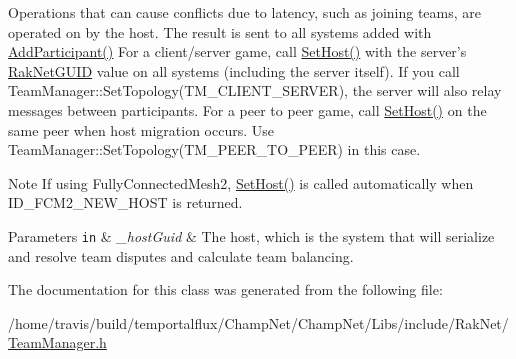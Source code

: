 Operations that can cause conflicts due to latency, such as joining teams, are operated on by the host. The result is sent to all systems added with \hyperlink{class_rak_net_1_1_t_m___world_a75531795fd1adc74d7edae660c4ecc17}{Add\-Participant()} For a client/server game, call \hyperlink{class_rak_net_1_1_t_m___world_a8de7c1244f4b38d2ad612c3c98d614ca}{Set\-Host()} with the server's \hyperlink{struct_rak_net_1_1_rak_net_g_u_i_d}{Rak\-Net\-G\-U\-I\-D} value on all systems (including the server itself). If you call Team\-Manager\-::\-Set\-Topology(\-T\-M\-\_\-\-C\-L\-I\-E\-N\-T\-\_\-\-S\-E\-R\-V\-E\-R), the server will also relay messages between participants. For a peer to peer game, call \hyperlink{class_rak_net_1_1_t_m___world_a8de7c1244f4b38d2ad612c3c98d614ca}{Set\-Host()} on the same peer when host migration occurs. Use Team\-Manager\-::\-Set\-Topology(\-T\-M\-\_\-\-P\-E\-E\-R\-\_\-\-T\-O\-\_\-\-P\-E\-E\-R) in this case. \begin{DoxyNote}{Note}
If using Fully\-Connected\-Mesh2, \hyperlink{class_rak_net_1_1_t_m___world_a8de7c1244f4b38d2ad612c3c98d614ca}{Set\-Host()} is called automatically when I\-D\-\_\-\-F\-C\-M2\-\_\-\-N\-E\-W\-\_\-\-H\-O\-S\-T is returned. 
\end{DoxyNote}

\begin{DoxyParams}[1]{Parameters}
\mbox{\tt in}  & {\em \-\_\-host\-Guid} & The host, which is the system that will serialize and resolve team disputes and calculate team balancing. \\
\hline
\end{DoxyParams}


The documentation for this class was generated from the following file\-:\begin{DoxyCompactItemize}
\item 
/home/travis/build/temportalflux/\-Champ\-Net/\-Champ\-Net/\-Libs/include/\-Rak\-Net/\hyperlink{_team_manager_8h}{Team\-Manager.\-h}\end{DoxyCompactItemize}
